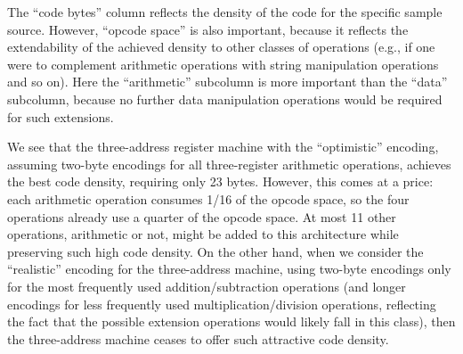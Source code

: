 \documentclass[12pt,oneside]{article}
\def\refpoint#1{{\rm\textbf{\ref{#1}}}}
\let\ptref=\refpoint
\begin{document}
\begin{table}
\caption{A summary of machine code properties for hypothetical 3-address, 2-address, 1-address, and stack machines, generated for a sample leaf function (cf.~\ptref{sp:cmp1.source}). The two most important columns, reflecting {\bf code density} and {\bf extendability} to other operations, are marked by bold font. Smaller values are better in both of these columns.}\label{tab:cmp1.code}
\end{table}

The ``code bytes'' column reflects the density of the code for the specific sample source. However, ``opcode space'' is also important, because it reflects the extendability of the achieved density to other classes of operations (e.g., if one were to complement arithmetic operations with string manipulation operations and so on). Here the ``arithmetic'' subcolumn is more important than the ``data'' subcolumn, because no further data manipulation operations would be required for such extensions.

We see that the three-address register machine with the ``optimistic'' encoding, assuming two-byte encodings for all three-register arithmetic operations, achieves the best code density, requiring only 23 bytes. However, this comes at a price: each arithmetic operation consumes 1/16 of the opcode space, so the four operations already use a quarter of the opcode space. At most 11 other operations, arithmetic or not, might be added to this architecture while preserving such high code density. On the other hand, when we consider the ``realistic'' encoding for the three-address machine, using two-byte encodings only for the most frequently used addition/subtraction operations (and longer encodings for less frequently used multiplication/division operations, reflecting the fact that the possible extension operations would likely fall in this class), then the three-address machine ceases to offer such attractive code density.
\end{document}
